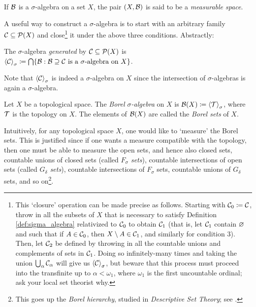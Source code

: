 \documentclass[reqno, twoside]{article}
\begin{document}
    \begin{definition}
        If $\mathcal{B}$ is a $\sigma$-algebra on a set $X$, the pair $(X,\mathcal{B})$ is said to be a \textit{measurable space}.
    \end{definition}

    A useful way to construct a $\sigma$-algebra is to start with an arbitrary family $\mathcal{C}\subseteq\mathcal{P}(X)$ and close\footnote{This `closure' operation can be made precise as follows. Starting with $\mathcal{C}_0\coloneqq\mathcal{C}$, throw in all the subsets of $X$ that is necessary to satisfy Definition \ref{def:sigma_algebra} relativized to $\mathcal{C}_0$ to obtain $\mathcal{C}_1$ (that is, let $\mathcal{C}_1$ contain $\varnothing$ and such that if $A\in\mathcal{C}_0$, then $X\setminus A\in\mathcal{C}_1$, and similarly for condition $3$). Then, let $\mathcal{C}_2$ be defined by throwing in all the countable unions and complements of sets in $\mathcal{C}_1$. Doing so infinitely-many times and taking the union $\bigcup_\alpha\mathcal{C}_\alpha$ will give us $\left\langle\mathcal{C}\right\rangle_\sigma$, but beware that this process must proceed into the transfinite up to $\alpha<\omega_1$, where $\omega_1$ is the first uncountable ordinal; ask your local set theorist why.} it under the above three conditions. Abstractly:
    
    \begin{definition}
        The $\sigma$-algebra \textit{generated} by $\mathcal{C}\subseteq\mathcal{P}(X)$ is $\left\langle\mathcal{C}\right\rangle_\sigma\coloneqq\bigcap\{\mathcal{B}:\mathcal{B}\supseteq\mathcal{C}\textrm{ is a }\sigma\textrm{-algebra on }X\}$.
    \end{definition}

    Note that $\left\langle\mathcal{C}\right\rangle_\sigma$ is indeed a $\sigma$-algebra on $X$ since the intersection of $\sigma$-algebras is again a $\sigma$-algebra.

    \begin{definition}
        Let $X$ be a topological space. The \textit{Borel $\sigma$-algebra} on $X$ is $\mathcal{B}(X)\coloneqq\left\langle\mathcal{T}\right\rangle_\sigma$, where $\mathcal{T}$ is the topology on $X$. The elements of $\mathcal{B}(X)$ are called the \textit{Borel sets} of $X$.
    \end{definition}

    Intuitively, for any topological space $X$, one would like to `measure' the Borel sets. This is justified since if one wants a measure compatible with the topology, then one must be able to measure the open sets, and hence also closed sets, countable unions of closed sets (called \textit{$F_\sigma$ sets}), countable intersections of open sets (called \textit{$G_\delta$ sets}), countable intersections of $F_\sigma$ sets, countable unions of $G_\delta$ sets, and so on\footnote{This goes up the \textit{Borel hierarchy}, studied in \textit{Descriptive Set Theory}; see \cite{Kec95}.}.
\end{document}
